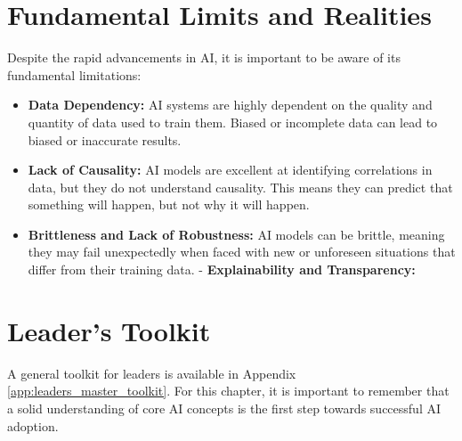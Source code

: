 \section{Fundamental Limits and Realities}
\label{sec:fundamental_limits}
Despite the rapid advancements in AI, it is important to be aware of its fundamental limitations:

\begin{itemize}
    \item \textbf{Data Dependency:} AI systems are highly dependent on the quality and quantity of data used to train them. Biased or incomplete data can lead to biased or inaccurate results.
    \item \textbf{Lack of Causality:} AI models are excellent at identifying correlations in data, but they do not understand causality. This means they can predict that something will happen, but not why it will happen.
    \item \textbf{Brittleness and Lack of Robustness:} AI models can be brittle, meaning they may fail unexpectedly when faced with new or unforeseen situations that differ from their training data.
    - \textbf{Explainability and Transparency:}
\end{itemize}

\section{Leader's Toolkit}
\label{sec:core_ai_leaders_toolkit}

A general toolkit for leaders is available in Appendix \ref{app:leaders_master_toolkit}. For this chapter, it is important to remember that a solid understanding of core AI concepts is the first step towards successful AI adoption.
